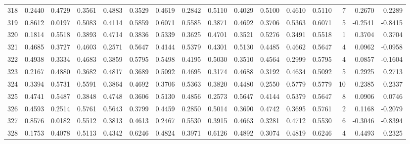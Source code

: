 \begin{tabular}{lrrrrrrrrrrrrrrr}
318 &      0.2440 &  0.4729 &  0.3561 &  0.4883 &  0.3529 &  0.4619 &  0.2842 &  0.5110 &  0.4029 &  0.5100 &   0.4610 &     0.5110 &      7 &                    0.2670 &                     0.2289 \\
319 &      0.8612 &  0.0197 &  0.5083 &  0.4114 &  0.5859 &  0.6071 &  0.5585 &  0.3871 &  0.4692 &  0.3706 &   0.5363 &     0.6071 &      5 &                   -0.2541 &                    -0.8415 \\
320 &      0.1814 &  0.5518 &  0.3893 &  0.4714 &  0.3836 &  0.5339 &  0.3625 &  0.4701 &  0.3521 &  0.5276 &   0.3491 &     0.5518 &      1 &                    0.3704 &                     0.3704 \\
321 &      0.4685 &  0.3727 &  0.4603 &  0.2571 &  0.5647 &  0.4144 &  0.5379 &  0.4301 &  0.5130 &  0.4485 &   0.4662 &     0.5647 &      4 &                    0.0962 &                    -0.0958 \\
322 &      0.4938 &  0.3334 &  0.4683 &  0.3859 &  0.5795 &  0.5498 &  0.4195 &  0.5030 &  0.3510 &  0.4564 &   0.2999 &     0.5795 &      4 &                    0.0857 &                    -0.1604 \\
323 &      0.2167 &  0.4880 &  0.3682 &  0.4817 &  0.3689 &  0.5092 &  0.4695 &  0.3174 &  0.4688 &  0.3192 &   0.4634 &     0.5092 &      5 &                    0.2925 &                     0.2713 \\
324 &      0.3394 &  0.5731 &  0.5591 &  0.3864 &  0.4692 &  0.3706 &  0.5363 &  0.3820 &  0.4480 &  0.2550 &   0.5779 &     0.5779 &     10 &                    0.2385 &                     0.2337 \\
325 &      0.4741 &  0.5487 &  0.3848 &  0.4748 &  0.3606 &  0.5130 &  0.4856 &  0.2573 &  0.5647 &  0.4144 &   0.5379 &     0.5647 &      8 &                    0.0906 &                     0.0746 \\
326 &      0.4593 &  0.2514 &  0.5761 &  0.5643 &  0.3799 &  0.4459 &  0.2850 &  0.5014 &  0.3690 &  0.4742 &   0.3695 &     0.5761 &      2 &                    0.1168 &                    -0.2079 \\
327 &      0.8576 &  0.0182 &  0.5512 &  0.3813 &  0.4613 &  0.2467 &  0.5530 &  0.3915 &  0.4663 &  0.3281 &   0.4712 &     0.5530 &      6 &                   -0.3046 &                    -0.8394 \\
328 &      0.1753 &  0.4078 &  0.5113 &  0.4342 &  0.6246 &  0.4824 &  0.3971 &  0.6126 &  0.4892 &  0.3074 &   0.4819 &     0.6246 &      4 &                    0.4493 &                     0.2325 \\

\end{tabular}
